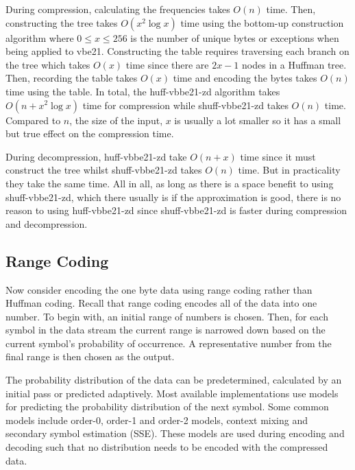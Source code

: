During compression, calculating the frequencies takes $O(n)$ time. Then,
constructing the tree takes $O(x^2\log x)$ time using the bottom-up construction
algorithm where $0\le x \le 256$ is the number of unique bytes or exceptions
when being applied to vbe21. Constructing the table requires traversing each
branch on the tree which takes $O(x)$ time since there are $2x-1$ nodes in a
Huffman tree. Then, recording the table takes $O(x)$ time and encoding the bytes
takes $O(n)$ time using the table. In total, the huff-vbbe21-zd algorithm takes
$O(n + x^2\log x)$ time for compression while shuff-vbbe21-zd takes $O(n)$ time. Compared
to $n$, the size of the input, $x$ is usually a lot smaller so it has a small
but true effect on the compression time.

During decompression, huff-vbbe21-zd take $O(n + x)$ time since it must construct the tree
whilst shuff-vbbe21-zd takes $O(n)$ time. But in practicality they take the same time. All
in all, as long as there is a space benefit to using shuff-vbbe21-zd, which there usually
is if the approximation is good, there is no reason to using huff-vbbe21-zd since shuff-vbbe21-zd is
faster during compression and decompression.



\subsection{Range Coding}

Now consider encoding the one byte data using range coding rather than Huffman
coding. Recall that range coding encodes all of the data into one number. To
begin with, an initial range of numbers is chosen. Then, for each symbol in the
data stream the current range is narrowed down based on the current symbol's
probability of occurrence. A representative number from the final range is then
chosen as the output.

The probability distribution of the data can be predetermined, calculated by an
initial pass or predicted adaptively. Most available implementations use models
for predicting the probability distribution of the next symbol.
Some common models include order-0, order-1 and order-2 models, context mixing and
secondary symbol estimation (SSE). These models are used during encoding and
decoding such that no distribution needs to be encoded with the compressed data.

